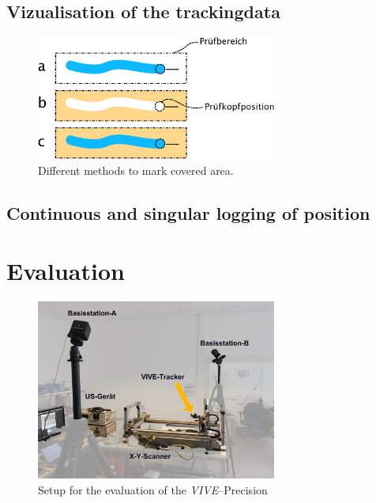 \documentclass{VRARWorkshop}
\begin{document}
\subsection{Vizualisation of the trackingdata}

\begin{figure}[h!]
    \begin{center}
        \includegraphics[width=79mm]{images/DrawVsErase.eps}
        \caption{\label{fig:DrawVsErase} Different methods to mark covered area.}
    \end{center}
\end{figure}

\subsection{Continuous and singular logging of position}

\section{Evaluation}

\begin{figure}[h!]
    \begin{center}
        \includegraphics[width=79mm]{images/PrecisionMeasurement.jpg}
        \caption{\label{fig:precisionMeasurement} Setup for the evaluation of the \textit{VIVE}--Precision}
    \end{center}
\end{figure}
\end{document}
